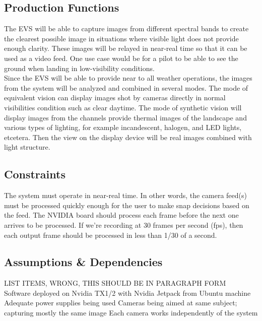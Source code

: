 \documentclass[letterpaper,10pt,serif,draftclsnofoot,onecolumn,compsoc,titlepage]{IEEEtran}
\begin{document}
\subsection{Production Functions}

The EVS will be able to capture images from different spectral bands to create the 
clearest possible image in situations where visible light does not provide enough 
clarity. These images will be relayed in near-real time so that it can be used as a 
video feed. One use case would be for a pilot to be able to see the ground when landing 
in low-visibility conditions.\\

Since the EVS will be able to provide near to all weather operations, the images from 
the system will be analyzed and combined in several modes. The mode of equivalent 
vision can display images shot by cameras directly in normal visibilities condition 
such as clear daytime. The mode of synthetic vision will display images from the 
channels provide thermal images of the landscape and various types of lighting, for 
example incandescent, halogen, and LED lights, etcetera. Then the view on the display 
device will be real images combined with light structure.\\

\subsection{Constraints}

The system must operate in near-real time. In other words, the camera feed(s) must be 
processed quickly enough for the user to make snap decisions based on the feed. The 
NVIDIA board should process each frame before the next one arrives to be processed. 
If we’re recording at 30 frames per second (fps), then each output frame should be 
processed in less than 1/30 of a second.\\

\subsection{Assumptions \& Dependencies}

LIST ITEMS, WRONG, THIS SHOULD BE IN PARAGRAPH FORM\\
Software deployed on Nvidia TX1/2 with Nvidia Jetpack from Ubuntu machine
Adequate power supplies being used
Cameras being aimed at same subject; capturing mostly the same image
Each camera works independently of the system
\end{document}
